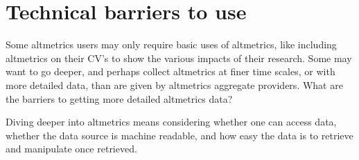 \documentclass[letterpaper,superscriptaddress,showkeys,longbibliography]{revtex4-1}\usepackage{graphicx, color}
\begin{document}

\section*{Technical barriers to use}

Some altmetrics users may only require basic uses of altmetrics, like including altmetrics on their CV's \cite{piwowar2013power} to show the various impacts of their research. Some may want to go deeper, and perhaps collect altmetrics at finer time scales, or with more detailed data, than are given by altmetrics aggregate providers. What are the barriers to getting more detailed altmetrics data? 

Diving deeper into altmetrics means considering whether one can access data, whether the data source is machine readable, and how easy the data is to retrieve and manipulate once retrieved. 
\end{document}
